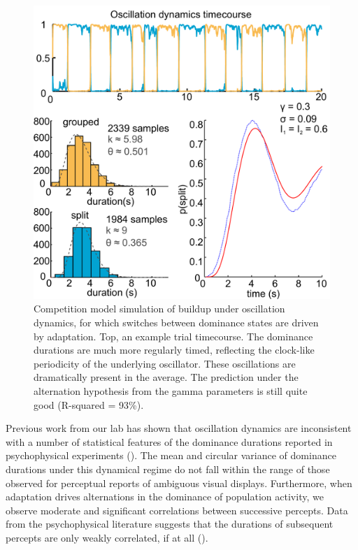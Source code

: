 \documentclass{frontiersSCNS} %
\begin{document}
\begin{figure}
		\centering
		
		\includegraphics[scale=.24]{hi_adapt_low_noise_equal_inputBUFsHists}
				
		\caption{Competition model simulation of buildup under oscillation dynamics, for which switches between dominance states are driven by adaptation. Top, an example trial timecourse. The dominance durations are much more regularly timed, reflecting the clock-like periodicity of the underlying oscillator. These oscillations are dramatically present in the average. The prediction under the alternation hypothesis from the gamma parameters is still quite good (R-squared = 93\%).}
		\label{oscillation_dynamic_buildup}
\end{figure}

Previous work from our lab has shown that oscillation dynamics are inconsistent with a number of statistical features of the dominance durations reported in psychophysical experiments (\cite{Shpiro2009}). The mean and circular variance of dominance durations under this dynamical regime do not fall within the range of those observed for perceptual reports of ambiguous visual displays. Furthermore, when adaptation drives alternations in the dominance of population activity, we observe moderate and significant correlations between successive percepts. Data from the psychophysical literature suggests that the durations of subsequent percepts are only weakly correlated, if at all (\cite{Pressnitzer2006}).
\end{document}
